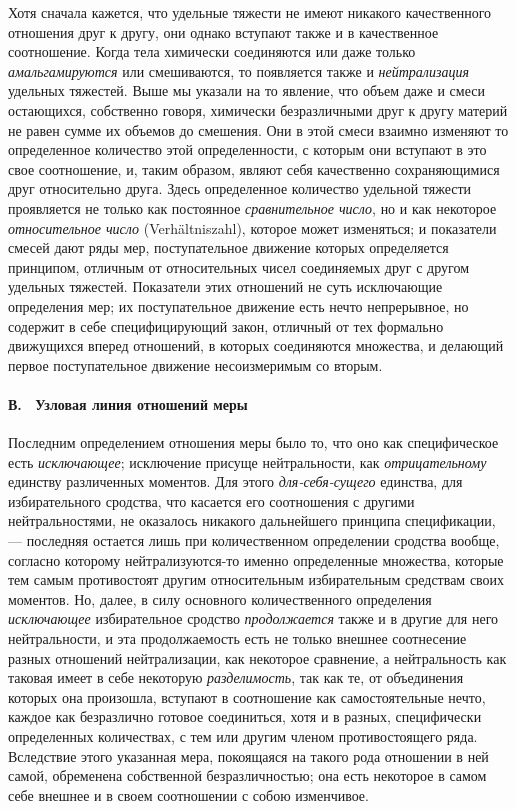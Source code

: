 Хотя сначала кажется, что удельные тяжести не имеют никакого качественного
отношения друг к другу, они однако вступают также и в качественное
соотношение. Когда тела химически соединяются или даже только
{\em амальгамируются} или смешиваются, то появляется
также и {\em нейтрализация} удельных тяжестей. Выше мы
указали на то явление, что объем даже и смеси остающихся, собственно
говоря, химически безразличными друг к другу материй не равен сумме их
объемов до смешения. Они в этой смеси взаимно изменяют то определенное
количество этой определенности, с которым они вступают в это свое
соотношение, и, таким образом, являют себя качественно сохраняющимися друг
относительно друга. Здесь определенное количество удельной тяжести
проявляется не только как постоянное {\em сравнительное
число}, но и как некоторое {\em относительное число}
(Verhältniszahl), которое может изменяться; и показатели смесей дают ряды
мер, поступательное движение которых определяется принципом, отличным от
относительных чисел соединяемых друг с другом удельных тяжестей. Показатели
этих отношений не суть исключающие определения мер; их поступательное
движение есть нечто непрерывное, но содержит в себе специфицирующий закон,
отличный от тех формально движущихся вперед отношений, в которых
соединяются множества, и делающий первое поступательное движение
несоизмеримым со вторым.

\paragraph[В. \ Узловая линия отношений меры]{В. \ Узловая линия отношений
меры}
\hypertarget{Toc478978686}{}Последним определением отношения меры было то,
что оно как специфическое есть {\em исключающее};
исключение присуще нейтральности, как
{\em отрицательному} единству различенных моментов. Для
этого {\em для-себя-сущего} единства, для
избирательного сродства, что касается его соотношения с другими
нейтральностями, не оказалось никакого дальнейшего принципа спецификации, —
последняя остается лишь при количественном определении сродства вообще,
согласно которому нейтрализуются-то именно определенные множества, которые
тем самым противостоят другим относительным избирательным средствам своих
моментов. Но, далее, в силу основного количественного определения
{\em исключающее} избирательное сродство
{\em продолжается} также и в другие для него
нейтральности, и эта продолжаемость есть не только внешнее соотнесение
разных отношений нейтрализации, как некоторое сравнение, а нейтральность
как таковая имеет в себе некоторую {\em разделимость},
так как те, от объединения которых она произошла, вступают в соотношение
как самостоятельные нечто, каждое как безразлично готовое соединиться, хотя
и в разных, специфически определенных количествах, с тем или другим членом
противостоящего ряда. Вследствие этого указанная мера, покоящаяся на такого
рода отношении в ней самой, обременена собственной безразличностью; она
есть некоторое в самом себе внешнее и в своем соотношении с собою
изменчивое.


